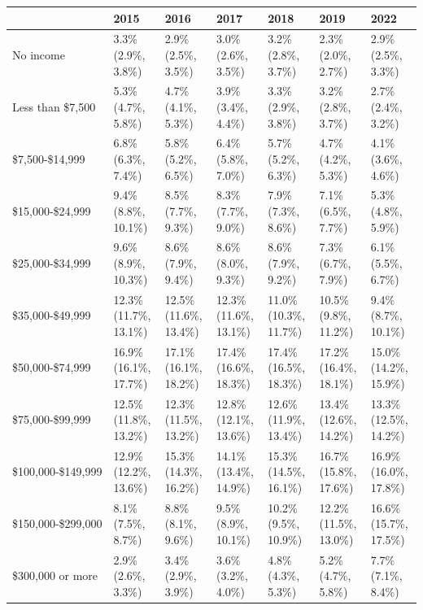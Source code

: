 \documentclass[
]{book}
\begin{document}
\begin{table}
\centering
\begin{tabular}[t]{>{}l|>{}l|>{}l|>{}l|>{}l|>{}l|>{}l}
\hline
  & 2015 & 2016 & 2017 & 2018 & 2019 & 2022\\
\hline
No income & 3.3\% (2.9\%, 3.8\%) & 2.9\% (2.5\%, 3.5\%) & 3.0\% (2.6\%, 3.5\%) & 3.2\% (2.8\%, 3.7\%) & 2.3\% (2.0\%, 2.7\%) & 2.9\% (2.5\%, 3.3\%)\\
\hline
Less than \$7,500 & 5.3\% (4.7\%, 5.8\%) & 4.7\% (4.1\%, 5.3\%) & 3.9\% (3.4\%, 4.4\%) & 3.3\% (2.9\%, 3.8\%) & 3.2\% (2.8\%, 3.7\%) & 2.7\% (2.4\%, 3.2\%)\\
\hline
\$7,500-\$14,999 & 6.8\% (6.3\%, 7.4\%) & 5.8\% (5.2\%, 6.5\%) & 6.4\% (5.8\%, 7.0\%) & 5.7\% (5.2\%, 6.3\%) & 4.7\% (4.2\%, 5.3\%) & 4.1\% (3.6\%, 4.6\%)\\
\hline
\$15,000-\$24,999 & 9.4\% (8.8\%, 10.1\%) & 8.5\% (7.7\%, 9.3\%) & 8.3\% (7.7\%, 9.0\%) & 7.9\% (7.3\%, 8.6\%) & 7.1\% (6.5\%, 7.7\%) & 5.3\% (4.8\%, 5.9\%)\\
\hline
\$25,000-\$34,999 & 9.6\% (8.9\%, 10.3\%) & 8.6\% (7.9\%, 9.4\%) & 8.6\% (8.0\%, 9.3\%) & 8.6\% (7.9\%, 9.2\%) & 7.3\% (6.7\%, 7.9\%) & 6.1\% (5.5\%, 6.7\%)\\
\hline
\$35,000-\$49,999 & 12.3\% (11.7\%, 13.1\%) & 12.5\% (11.6\%, 13.4\%) & 12.3\% (11.6\%, 13.1\%) & 11.0\% (10.3\%, 11.7\%) & 10.5\% (9.8\%, 11.2\%) & 9.4\% (8.7\%, 10.1\%)\\
\hline
\$50,000-\$74,999 & 16.9\% (16.1\%, 17.7\%) & 17.1\% (16.1\%, 18.2\%) & 17.4\% (16.6\%, 18.3\%) & 17.4\% (16.5\%, 18.3\%) & 17.2\% (16.4\%, 18.1\%) & 15.0\% (14.2\%, 15.9\%)\\
\hline
\$75,000-\$99,999 & 12.5\% (11.8\%, 13.2\%) & 12.3\% (11.5\%, 13.2\%) & 12.8\% (12.1\%, 13.6\%) & 12.6\% (11.9\%, 13.4\%) & 13.4\% (12.6\%, 14.2\%) & 13.3\% (12.5\%, 14.2\%)\\
\hline
\$100,000-\$149,999 & 12.9\% (12.2\%, 13.6\%) & 15.3\% (14.3\%, 16.2\%) & 14.1\% (13.4\%, 14.9\%) & 15.3\% (14.5\%, 16.1\%) & 16.7\% (15.8\%, 17.6\%) & 16.9\% (16.0\%, 17.8\%)\\
\hline
\$150,000-\$299,000 & 8.1\% (7.5\%, 8.7\%) & 8.8\% (8.1\%, 9.6\%) & 9.5\% (8.9\%, 10.1\%) & 10.2\% (9.5\%, 10.9\%) & 12.2\% (11.5\%, 13.0\%) & 16.6\% (15.7\%, 17.5\%)\\
\hline
\$300,000 or more & 2.9\% (2.6\%, 3.3\%) & 3.4\% (2.9\%, 3.9\%) & 3.6\% (3.2\%, 4.0\%) & 4.8\% (4.3\%, 5.3\%) & 5.2\% (4.7\%, 5.8\%) & 7.7\% (7.1\%, 8.4\%)\\
\hline
\end{tabular}
\end{table}
\end{document}
